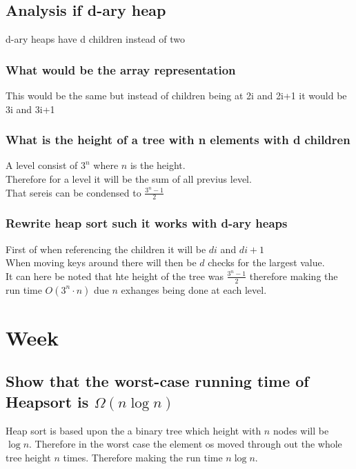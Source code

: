 \documentclass[12pt, a4paper]{article}
\begin{document}
			\subsection{Analysis if d-ary heap}
				d-ary heaps have d children instead of two
				\subsubsection{What would be the array representation}
					This would be the same but instead of children being at 2i and 2i+1 it would be 3i and 3i+1\\
				\subsubsection{What is the height of a tree with n elements with d children}
					A level consist of $3^n$ where $n$ is the height.\\
					Therefore for a level it will be the sum of all previus level.\\
					That sereis can be condensed to $\frac{3^n-1}{2}$
				\subsubsection{Rewrite heap sort such it works with d-ary heaps}
					First of when referencing the children it will be $di$ and $di+1$\\
					When moving keys around there will then be $d$ checks for the largest value.\\
					It can here be noted that hte height of the tree was $\frac{3^n-1}{2}$ therefore making the run time $O(3^n\cdot n)$ due $n$ exhanges being done at each level.
		\section{Week}
			\subsection{Show that the worst-case running time of Heapsort is $\Omega(n\log n)$}
				Heap sort is based upon the a binary tree which height with $n$ nodes will be $\log n$. Therefore in the worst case the element os moved through out the whole tree height $n$ times. Therefore making the run time $n \log n$. 
\end{document}
